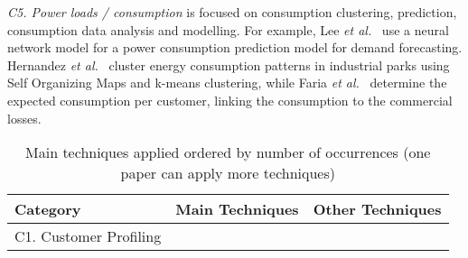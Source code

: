 \documentclass[journal]{IEEEtran}
\begin{document}
\textit{C5. Power loads / consumption} is focused on consumption clustering, prediction, consumption data analysis and modelling.
For example, Lee \textit{et al.}~ use a neural network model for a power consumption prediction model for demand forecasting. Hernandez \textit{et al.}~ cluster energy consumption patterns in industrial parks using Self Organizing Maps and k-means clustering, while Faria \textit{et al.}~ determine the expected consumption per customer, linking the consumption to the commercial losses.

\begin{table*}[!htbp]%
\renewcommand{\arraystretch}{1.3}
\caption{Main techniques applied ordered by number of occurrences (one paper can apply more techniques)}
\label{tbl:techniques-mapping}
\scriptsize
\tabcolsep=0.11cm
\begin{tabular}{|p{1.5cm}|p{7.0cm}p{8.5cm}|}
\hline
\textbf{Category} & \textbf{Main Techniques} & \textbf{Other Techniques} \\
\hline
C1. Customer Profiling& 



\end{tabular}
\end{table*}
\end{document}

